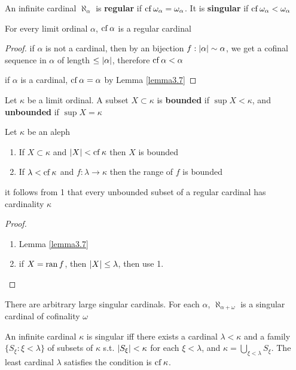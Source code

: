 \documentclass[11pt]{article}
\begin{document}
An infinite cardinal \(\aleph_\alpha\) is \textbf{regular} if \(\operatorname{cf}\omega_\alpha=\omega_\alpha\). It is \textbf{singular} if \(\operatorname{cf}\omega_\alpha<\omega_\alpha\)

\begin{lemma}[]
For every limit ordinal \(\alpha\), \(\operatorname{cf}\alpha\) is a regular cardinal
\end{lemma}

\begin{proof}
if \(\alpha\) is not a cardinal, then by an bijection \(f:\abs{\alpha}\sim\alpha\), we get a cofinal sequence in
\(\alpha\) of length \(\le\abs{\alpha}\), therefore \(\operatorname{cf}\alpha<\alpha\)

if \(\alpha\) is a cardinal, \(\operatorname{cf}\alpha=\alpha\) by Lemma \ref{lemma3.7}
\end{proof}

Let \(\kappa\) be a limit ordinal. A subset \(X\subset\kappa\) is \textbf{bounded} if \(\sup X<\kappa\), and \textbf{unbounded}
if \(\sup X=\kappa\)

\begin{lemma}[]
Let \(\kappa\) be an aleph
\begin{enumerate}
\item If \(X\subset\kappa\) and \(\abs{X}<\cf\kappa\) then \(X\) is bounded
\item If \(\lambda<\operatorname{cf}\kappa\) and \(f:\lambda\to\kappa\) then the range of \(f\) is bounded
\end{enumerate}
\end{lemma}

it follows from 1 that every unbounded subset of a regular cardinal has cardinality \(\kappa\)

\begin{proof}
\begin{enumerate}
\item Lemma \ref{lemma3.7}
\item if \(X=\operatorname{ran} f\), then \(\abs{X}\le\lambda\), then use 1.
\end{enumerate}
\end{proof}

There are arbitrary large singular cardinals. For each \(\alpha\), \(\aleph_{\alpha+\omega}\) is a singular cardinal of
cofinality \(\omega\)

\begin{lemma}[]
An infinite cardinal \(\kappa\) is singular iff there exists a cardinal \(\lambda<\kappa\) and a
family \(\{S_\xi:\xi<\lambda\}\) of subsets of \(\kappa\) s.t. \(\abs{S_\xi}<\kappa\) for each \(\xi<\lambda\),
and \(\kappa=\bigcup_{\xi<\lambda}S_\xi\). The least cardinal \(\lambda\) satisfies the condition is \(\operatorname{cf}\kappa\).
\end{lemma}
\end{document}
